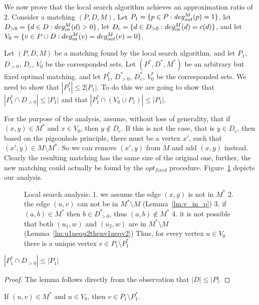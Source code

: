 We now prove that the local search algorithm achieves an approximation ratio of $2$.
Consider a matching $(P, D, M)$,
Let $P_1 = \{p \in P : deg^M_{out}(p) = 1\}$,
let $D_{>0} = \{d \in D : deg^M_{in}(d) > 0\}$,
let $D_c = \{d \in D_{>0} : deg^M_{in}(d) = c(d)\}$,
and let $V_0 = \{v \in P \cup D : deg^M_{in}(v) = deg^M_{out}(v) = 0\}$. 

Let $(P, D, M)$ be a matching found by the local search algorithm, 
and let $P_1$, $D_{>0}$, $D_c$, $V_0$ be the corresponded sets.
Let $(P^*, D^*, M^*)$ be an arbitrary but fixed optimal matching.
and let $P^*_1$, $D^*_{>0}$, $D^*_c$, $V^*_0$ be the corresponded sets.
We need to show that $|P^*_1| \leq 2|P_1|$.
To do this we are going to show that 
$|P^*_1 \cap D_{>0}| \leq |P_1|$ 
and that
$|P^*_1 \cap (V_0 \cup P_1)| \leq |P_1|$.


For the purpose of the analysis, assume, without loss of generality, that
if $(x, y) \in M^*$ and $x \in V_0$, then $y \notin D_c$.
If this is not the case, that is $y \in D_c$, then based on the pigeonhole principle,
there must be a vertex $x'$, such that $(x', y) \in M \setminus M^*$.
So we can remove $(x', y)$ from $M$ and add $(x, y)$ instead.
Clearly the resulting matching has the same size of the original one,
further, the new matching could actually be found by the $opt_{fixed}$ procedure.
Figure~\ref{fig:uwcm-illustration} depicts our analysis.

\begin{figure}
\centering

\caption{
\label{fig:uwcm-illustration}
Local search analysis:
1. we assume the edge $(x, y)$ is not in $M^*$
2. the edge $(u,v)$ can not be in $M^* \setminus M$ (Lemma~\ref{lm:v_in_p})
3. if $(a,b) \in M^*$ then $b \in D^*_{>0}$, thus $(a,b) \notin M^*$
4. it is not possible that both $(u_1, w)$ and $(u_2, w)$ are in $M^* \setminus M$
(Lemma~\ref{lm:u1nequ2thenv1neqv2})
Thus, for every vertex $u \in V_0$ there is a unique vertex $v \in P_1 \setminus P^*_1$
}
\end{figure}

\begin{lemma}
\label{lm:dleqp}
$|P^*_1 \cap D_{>0}| \leq |P_1|$
\end{lemma}

\begin{proof}
The lemma follows directly from the observation that 
${|D| \leq |P|}$.
\end{proof}

\begin{lemma}
\label{lm:v_in_p}
If $(u, v) \in M^*$ and $u \in V_0$, then $v \in P_1 \setminus P^*_1$.
\end{lemma}

